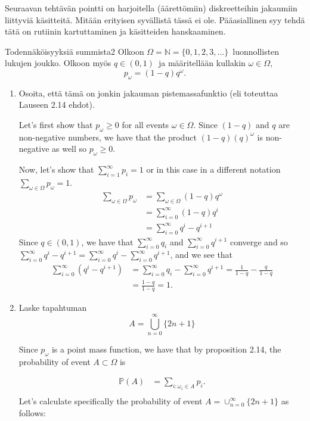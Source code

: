 \documentclass[11pt,a4paper]{amsart}
\newcommand{\N}{\mathbb{N}}
\newcommand{\1}{\mathbf{1}}
\renewcommand{\P}{\mathbb P}
\begin{document}
Seuraavan tehtävän pointti on harjoitella (äärettömiin) diskreetteihin jakaumiin liittyviä käsitteitä. Mitään erityisen syvällistä tässä ei ole. Pääasiallinen syy tehdä tätä on rutiinin kartuttaminen ja käsitteiden hanskaaminen.

\begin{Exercises}{Todennäköisyyksiä summista}{2}
Olkoon $\Omega=\N=\{0,1,2,3,...\}$ luonnollisten lukujen joukko. Olkoon myös $q\in (0,1)$ ja määritellään kullakin $\omega \in \Omega$‚ 
\[
p_\omega=(1-q) q^\omega.
\]
\begin{enumerate}
\item Osoita, että tämä on jonkin jakauman pistemassafunktio (eli toteuttaa Lauseen 2.14 ehdot).

    Let's first show that $ p_{\omega} \geq 0$ for all events $ \omega \in\Omega$. Since $ (1-q)$
    and $ q$ are non-negative numbers, we have that the product $ (1-q)(q)^{\omega} $ is
    non-negative as well so $ p_{\omega} \geq 0$.

    Now, let's show that $ \sum_{i=1}^{\infty} p_{i} = 1$ or in this case in a different notation $
    \sum_{\omega \in \Omega}^{} p_{\omega} = 1$. 
    \begin{align*}
	\sum_{\omega \in \Omega}^{} p_{\omega} &= \sum_{\omega \in \Omega}^{} (1-q) q^{\omega} \\
					       &= \sum_{i=0}^{\infty} (1-q) q^{i} \\
					       &= \sum_{i=0}^{\infty} q^{i} - q^{i+1} 
    \end{align*}
    Since $ q \in (0,1) $, we have that $ \sum_{i=0}^{\infty} q_{i} $ and $ \sum_{i=0}^{\infty}
    q^{i+1}  $ converge and so $ \sum_{i=0}^{\infty} q^{i} - q^{i+1}  = \sum_{i=0}^{\infty} q^{i} -
    \sum_{i=0}^{\infty} q^{i+1} $, and we see that 
    \begin{align*}
	\sum_{i=0}^{\infty} (q^{i} - q^{i+1} ) &= \sum_{i=0}^{\infty} q_{i} - \sum_{i=0}^{\infty}
	q^{i+1} = \frac{1}{1-q} - \frac{q}{1-q}\\ 
					       &= \frac{1-q}{1-q} = 1. 
    \end{align*}
\item Laske tapahtuman
\[
A=\bigcup_{n=0}^\infty \{2n+1\}
\]

    Since $ p_{\omega} $ is a point mass function, we have that by proposition 2.14,
    the probability of event $ A \subset \Omega$ is 

    \begin{align*}
	\P(A) &= \sum_{i: \omega_{i} \in A}^{} p_{i}. \\
    \end{align*}
    Let's calculate specifically the probability of event $ A = \cup_{n=0}^{\infty} \{ 2n+1 \}	$ as
    follows:


\end{enumerate}
\end{Exercises}
\end{document}
